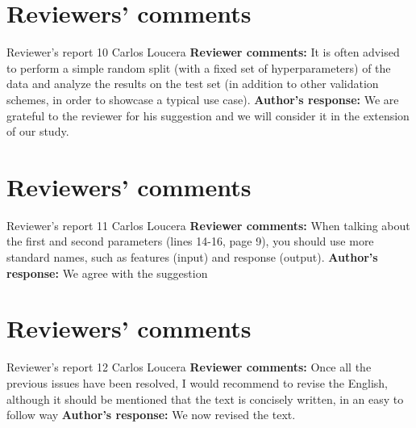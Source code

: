 \documentclass{bmcart}
\begin{document}
\begin{backmatter}
\section*{Reviewers' comments}
\newline Reviewer's report 10
\newline Carlos Loucera
\newline \textbf{Reviewer comments:}
It is often advised to perform a simple random split (with a fixed set of hyperparameters) of the data and analyze the results on the test set (in addition to other validation schemes, in order to showcase a typical use case).
\newline \textbf{Author's response:}
 We are grateful to the reviewer for his suggestion and we will consider it in the extension of our study.

\section*{Reviewers' comments}
\newline Reviewer's report 11
\newline Carlos Loucera
\newline \textbf{Reviewer comments:}
When talking about the first and second parameters (lines 14-16, page 9), you should use more standard names, such as features (input) and response (output).
\newline \textbf{Author's response:}
We agree with the suggestion

\section*{Reviewers' comments}
\newline Reviewer's report 12
\newline Carlos Loucera
\newline \textbf{Reviewer comments:}
Once all the previous issues have been resolved, I would recommend to revise the English, although it should be mentioned that the text is concisely written, in an easy to follow way
\newline \textbf{Author's response:}
We now revised the text.




\end{backmatter}
\end{document}
